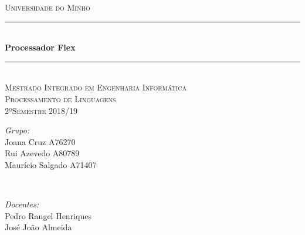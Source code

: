 \documentclass[25pt]{article}
\begin{document}
    
    \begin{titlepage}
    
    \newcommand{\HRule}{\rule{\linewidth}{0.5mm}} %
    
    \center %
    
    
    \textsc{\LARGE Universidade do Minho}\\[1.5cm]
    \HRule \\[0.4cm]
    { \huge \bfseries Processador Flex}\\[0.4cm]
    \HRule \\[1.5cm]
    \textsc{\Large Mestrado Integrado em Engenharia Informática}\\[0.5cm]
    \textsc{\large Processamento de Linguagens}\\[0.5cm]
    \textsc{\large 2ºSemestre 2018/19}\\[0.5cm]
    
    
    
    \begin{minipage}{0.4\textwidth}
    \begin{flushleft} \large
    \emph{Grupo:}\\
    Joana Cruz A76270 \\
    Rui Azevedo A80789 \\
    Maurício Salgado A71407 \\
    \end{flushleft}
    \end{minipage}
    ~
    \begin{minipage}{0.4\textwidth}
    \begin{flushright} \large
    \emph{Docentes:} \\
    Pedro Rangel Henriques\\
    José João Almeida\\
    \end{flushright}
    \end{minipage}\\[2cm]
    

\end{titlepage}
\end{document}
